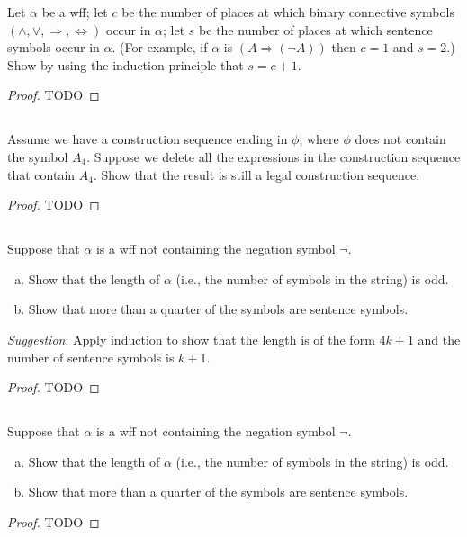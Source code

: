\documentclass{report}
\begin{document}
  Let $\alpha$ be a wff; let $c$ be the number of places at which binary
    connective symbols $(\land, \lor, \Rightarrow, \Leftrightarrow)$ occur in
    $\alpha$; let $s$ be the number of places at which sentence symbols occur in
    $\alpha$.
  (For example, if $\alpha$ is $(A \Rightarrow (\neg A))$ then $c = 1$ and
    $s = 2$.)
  Show by using the induction principle that $s = c + 1$.

  \begin{proof}
    TODO
  \end{proof}

\subsection{}%

  Assume we have a construction sequence ending in $\phi$, where $\phi$ does not
    contain the symbol $A_4$.
  Suppose we delete all the expressions in the construction sequence that
    contain $A_4$.
  Show that the result is still a legal construction sequence.

  \begin{proof}
    TODO
  \end{proof}

\subsection{}%

  Suppose that $\alpha$ is a wff not containing the negation symbol $\neg$.
  \begin{enumerate}[(a)]
    \item Show that the length of $\alpha$ (i.e., the number of symbols in the
      string) is odd.
    \item Show that more than a quarter of the symbols are sentence symbols.
  \end{enumerate}
  \textit{Suggestion}: Apply induction to show that the length is of the form
    $4k + 1$ and the number of sentence symbols is $k + 1$.

  \begin{proof}
    TODO
  \end{proof}

\subsection{}%

  Suppose that $\alpha$ is a wff not containing the negation symbol $\neg$.
  \begin{enumerate}[(a)]
    \item Show that the length of $\alpha$ (i.e., the number of symbols in the
      string) is odd.
    \item Show that more than a quarter of the symbols are sentence symbols.
  \end{enumerate}

  \begin{proof}
    TODO
  \end{proof}
\end{document}

